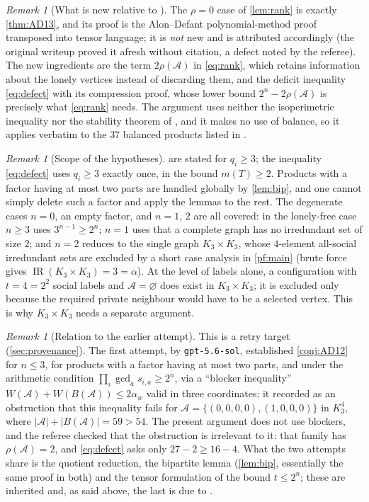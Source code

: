 \documentclass[11pt,a4paper]{article}
\theoremstyle{plain}
\theoremstyle{definition}
\theoremstyle{remark}
\newtheorem{remark}[theorem]{Remark}
\newcommand{\IR}{\operatorname{IR}}
\newcommand{\cA}{\mathcal A}
\newcommand{\rk}{\rho}
\newcommand{\alw}{\alpha_w}
\begin{document}
\begin{remark}[What is new relative to \cite{AD20}]\label{rem:novelty}
The $\rk=0$ case of \cref{lem:rank} is exactly \cref{thm:AD13}, and its proof is the Alon--Defant polynomial-method proof transposed into tensor language; it is \emph{not} new and is attributed accordingly (the original writeup proved it afresh without citation, a defect noted by the referee). The new ingredients are the term $2\rk(\cA)$ in \eqref{eq:rank}, which retains information about the lonely vertices instead of discarding them, and the deficit inequality \eqref{eq:defect} with its compression proof, whose lower bound $2^n-2\rk(\cA)$ is precisely what \eqref{eq:rank} needs. The argument uses neither the isoperimetric inequality nor the stability theorem of \cite{AD20}, and it makes no use of balance, so it applies verbatim to the $37$ balanced products listed in \cite[Section~3]{AD20}.
\end{remark}

\begin{remark}[Scope of the hypotheses]\label{rem:scope}
 are stated for $q_i\ge3$; the inequality \eqref{eq:defect} uses $q_i\ge3$ exactly once, in the bound $m(T)\ge2$. Products with a factor having at most two parts are handled globally by \cref{lem:bip}, and one cannot simply delete such a factor and apply the lemmas to the rest. The degenerate cases $n=0$, an empty factor, and $n=1$, $2$ are all covered: in the lonely-free case $n\ge3$ uses $3^{n-1}\ge2^n$; $n=1$ uses that a complete graph has no irredundant set of size $2$; and $n=2$ reduces to the single graph $K_3\times K_3$, whose $4$-element all-social irredundant sets are excluded by a short case analysis in \cref{pf:main} (brute force gives $\IR(K_3\times K_3)=3=\alpha$). At the level of labels alone, a configuration with $t=4=2^2$ social labels and $\cA=\varnothing$ does exist in $K_3\times K_3$; it is excluded only because the required private neighbour would have to be a selected vertex. This is why $K_3\times K_3$ needs a separate argument.
\end{remark}

\begin{remark}[Relation to the earlier attempt]\label{rem:retry}
This is a retry target (\cref{sec:provenance}). The first attempt, by \texttt{gpt-5.6-sol}, established \cref{conj:AD12} for $n\le3$, for products with a factor having at most two parts, and under the arithmetic condition $\prod_i\gcd_as_{i,a}\ge2^n$, via a ``blocker inequality'' $W(\cA)+W(B(\cA))\le2\alw$ valid in three coordinates; it recorded as an obstruction that this inequality fails for $\cA=\{(0,0,0,0),(1,0,0,0)\}$ in $K_3^4$, where $|\cA|+|B(\cA)|=59>54$. The present argument does not use blockers, and the referee checked that the obstruction is irrelevant to it: that family has $\rk(\cA)=2$, and \eqref{eq:defect} asks only $27-2\ge16-4$. What the two attempts share is the quotient reduction, the bipartite lemma (\cref{lem:bip}, essentially the same proof in both) and the tensor formulation of the bound $t\le2^n$; these are inherited and, as said above, the last is due to \cite{AD20}.
\end{remark}
\end{document}
